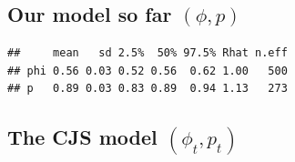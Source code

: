 \documentclass[
  12pt,
]{krantz}
\begin{document}
\hypertarget{our-model-so-far-phi-p-1}{%
\subsection{\texorpdfstring{Our model so far \((\phi, p)\)}{Our model so far (\textbackslash phi, p)}}\label{our-model-so-far-phi-p-1}}

\begin{verbatim}
##     mean   sd 2.5%  50% 97.5% Rhat n.eff
## phi 0.56 0.03 0.52 0.56  0.62 1.00   500
## p   0.89 0.03 0.83 0.89  0.94 1.13   273
\end{verbatim}

\hypertarget{the-cjs-model-phi_t-p_t}{%
\subsection{\texorpdfstring{The CJS model \((\phi_t, p_t)\)}{The CJS model (\textbackslash phi\_t, p\_t)}}\label{the-cjs-model-phi_t-p_t}}
\end{document}
